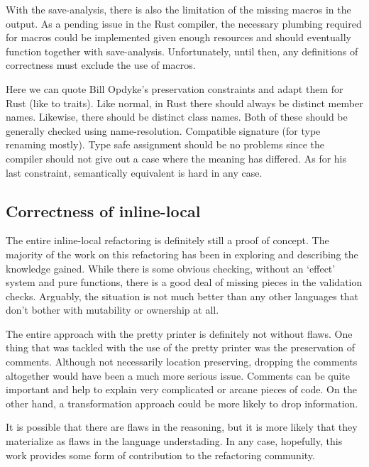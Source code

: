 With the save-analysis, there is also the limitation of the missing macros in the output. As a pending issue in the Rust compiler, the necessary plumbing required for macros could be implemented given enough resources and should eventually function together with save-analysis. Unfortunately, until then, any definitions of correctness must exclude the use of macros. 

Here we can quote Bill Opdyke's preservation constraints and adapt them for Rust (like to traits). Like normal, in Rust there should always be distinct member names. Likewise, there should be distinct class names. Both of these should be generally checked using name-resolution. Compatible signature (for type renaming mostly). Type safe assignment should be no problems since the compiler should not give out a case where the meaning has differed. As for his last constraint, semantically equivalent is hard in any case.

\subsection{Correctness of inline-local}
The entire inline-local refactoring is definitely still a proof of concept. The majority of the work on this refactoring has been in exploring and describing the knowledge gained. While there is some obvious checking, without an `effect' system and pure functions, there is a good deal of missing pieces in the validation checks. Arguably, the situation is not much better than any other languages that don't bother with mutability or ownership at all.

The entire approach with the pretty printer is definitely not without flaws. One thing that was tackled with the use of the pretty printer was the preservation of comments. Although not necessarily location preserving, dropping the comments altogether would have been a much more serious issue. Comments can be quite important and help to explain very complicated or arcane pieces of code. On the other hand, a transformation approach could be more likely to drop information.


It is possible that there are flaws in the reasoning, but it is  more likely that they materialize as flaws in the language understading. In any case, hopefully, this work provides some form of contribution to the refactoring community.

